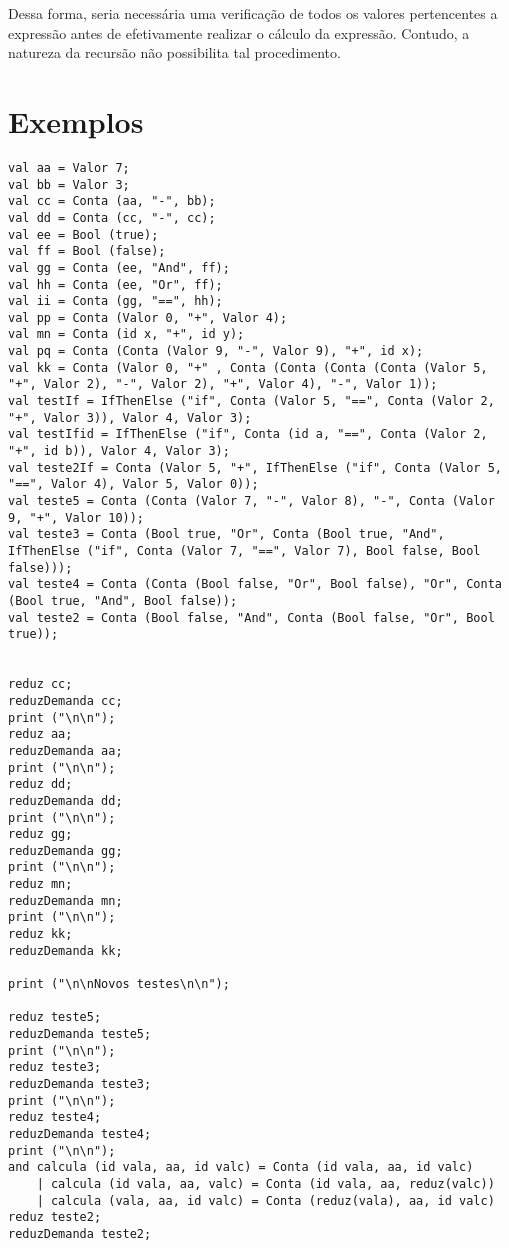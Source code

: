 \documentclass[brazil,times]{abnt}
\begin{document}
Dessa forma, seria necessária uma verificação de todos os valores pertencentes a expressão antes de efetivamente realizar o cálculo da expressão. Contudo, a natureza da recursão não possibilita tal procedimento.

\chapter{Exemplos}

\begin{lstlisting}
val aa = Valor 7; 
val bb = Valor 3;
val cc = Conta (aa, "-", bb);
val dd = Conta (cc, "-", cc);
val ee = Bool (true);
val ff = Bool (false);
val gg = Conta (ee, "And", ff);
val hh = Conta (ee, "Or", ff);
val ii = Conta (gg, "==", hh);
val pp = Conta (Valor 0, "+", Valor 4);
val mn = Conta (id x, "+", id y);
val pq = Conta (Conta (Valor 9, "-", Valor 9), "+", id x);
val kk = Conta (Valor 0, "+" , Conta (Conta (Conta (Conta (Valor 5, "+", Valor 2), "-", Valor 2), "+", Valor 4), "-", Valor 1));
val testIf = IfThenElse ("if", Conta (Valor 5, "==", Conta (Valor 2, "+", Valor 3)), Valor 4, Valor 3);
val testIfid = IfThenElse ("if", Conta (id a, "==", Conta (Valor 2, "+", id b)), Valor 4, Valor 3);
val teste2If = Conta (Valor 5, "+", IfThenElse ("if", Conta (Valor 5, "==", Valor 4), Valor 5, Valor 0));
val teste5 = Conta (Conta (Valor 7, "-", Valor 8), "-", Conta (Valor 9, "+", Valor 10));
val teste3 = Conta (Bool true, "Or", Conta (Bool true, "And", IfThenElse ("if", Conta (Valor 7, "==", Valor 7), Bool false, Bool false)));
val teste4 = Conta (Conta (Bool false, "Or", Bool false), "Or", Conta (Bool true, "And", Bool false));
val teste2 = Conta (Bool false, "And", Conta (Bool false, "Or", Bool true));


reduz cc;
reduzDemanda cc;
print ("\n\n");
reduz aa;
reduzDemanda aa;
print ("\n\n");
reduz dd;
reduzDemanda dd;
print ("\n\n");
reduz gg;
reduzDemanda gg;
print ("\n\n");
reduz mn;
reduzDemanda mn;
print ("\n\n");
reduz kk;
reduzDemanda kk;

print ("\n\nNovos testes\n\n");

reduz teste5;
reduzDemanda teste5;
print ("\n\n");
reduz teste3;
reduzDemanda teste3;
print ("\n\n");
reduz teste4;
reduzDemanda teste4;
print ("\n\n");
and calcula (id vala, aa, id valc) = Conta (id vala, aa, id valc)
	| calcula (id vala, aa, valc) = Conta (id vala, aa, reduz(valc))
	| calcula (vala, aa, id valc) = Conta (reduz(vala), aa, id valc)
reduz teste2;
reduzDemanda teste2;


\end{lstlisting}
\end{document}
